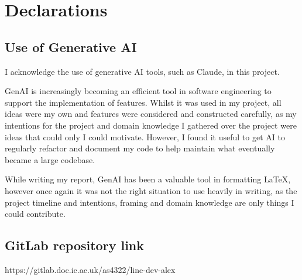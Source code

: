 \chapter*{Declarations}

\section*{Use of Generative AI}

I acknowledge the use of generative AI tools, such as Claude, in this project. 

GenAI is increasingly becoming an efficient tool in software engineering to support the implementation of features. Whilst it was used in my project, all ideas were my own and features were considered and constructed carefully, as my intentions for the project and domain knowledge I gathered over the project were ideas that could only I could motivate. However, I found it useful to get AI to regularly refactor and document my code to help maintain what eventually became a large codebase.

While writing my report, GenAI has been a valuable tool in formatting LaTeX, however once again it was not the right situation to use heavily in writing, as the project timeline and intentions, framing and domain knowledge are only things I could contribute.

\section*{GitLab repository link}

https://gitlab.doc.ic.ac.uk/as4322/line-dev-alex